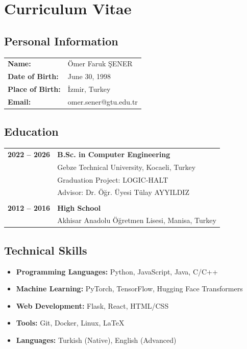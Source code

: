 \chapter*{Curriculum Vitae}

\section*{Personal Information}

\begin{tabular}{ll}
\textbf{Name:} & Ömer Faruk ŞENER \\
\textbf{Date of Birth:} & June 30, 1998 \\
\textbf{Place of Birth:} & İzmir, Turkey \\
\textbf{Email:} & omer.sener@gtu.edu.tr \\
\end{tabular}

\section*{Education}

\begin{tabular}{p{3cm}p{10cm}}
\textbf{2022 -- 2026} & \textbf{B.Sc. in Computer Engineering} \\
& Gebze Technical University, Kocaeli, Turkey \\
& Graduation Project: LOGIC-HALT \\
& Advisor: Dr. Öğr. Üyesi Tülay AYYILDIZ \\
\\
\textbf{2012 -- 2016} & \textbf{High School} \\
& Akhisar Anadolu Öğretmen Lisesi, Manisa, Turkey \\
\end{tabular}

\section*{Technical Skills}

\begin{itemize}
    \item \textbf{Programming Languages:} Python, JavaScript, Java, C/C++
    \item \textbf{Machine Learning:} PyTorch, TensorFlow, Hugging Face Transformers
    \item \textbf{Web Development:} Flask, React, HTML/CSS
    \item \textbf{Tools:} Git, Docker, Linux, LaTeX
    \item \textbf{Languages:} Turkish (Native), English (Advanced)
\end{itemize}

